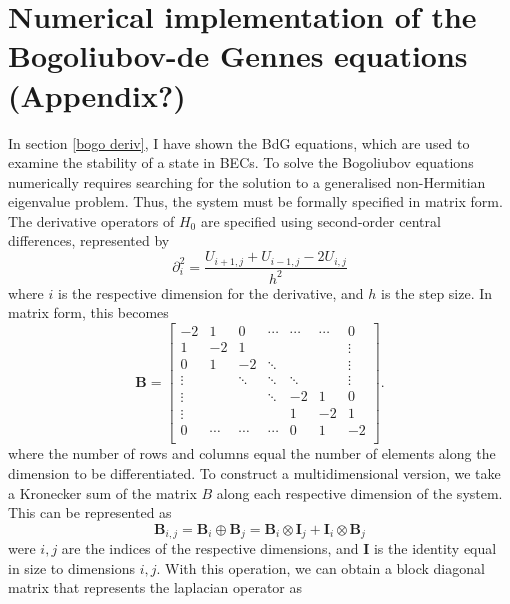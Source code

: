 \section{Numerical implementation of the Bogoliubov-de Gennes equations (Appendix?)}
In section \ref{bogo deriv}, I have shown the BdG equations, which are used to examine the stability of a state in BECs. To solve the Bogoliubov equations numerically requires searching for the solution to a generalised non-Hermitian eigenvalue problem. Thus, the system must be formally specified in matrix form. The derivative operators of $H_0$ are specified using second-order central differences, represented by
\begin{equation}
    \partial^2_i = \frac{U_{i+1,j} + U_{i-1,j} - 2U_{i,j}}{h^2}
\end{equation}
where $i$ is the respective dimension for the derivative, and $h$ is the step size. In matrix form, this becomes
\begin{equation}
    \mathbf{B} =
    \begin{bmatrix}
            -2      &   1    &    0   &  \cdots   &  \cdots   &  \cdots   & 0 \\
            1       &   -2   &    1   &           &           &     &  \vdots \\
            0       &    1   &   -2   & \ddots    &           &     &  \vdots \\
            \vdots  &        & \ddots & \ddots    & {\ddots}  &     &  \vdots \\
            \vdots  &        &        & \ddots    &    -2     &  1  &       0 \\
            \vdots  &        &        &           &     1     & -2  &       1 \\
            0       & \cdots & \cdots & \cdots    &     0     &  1  &      -2 \\
        \end{bmatrix}.
\end{equation}
where the number of rows and columns equal the number of elements along the dimension to be differentiated. To construct a multidimensional version, we take a Kronecker sum of the matrix $B$ along each respective dimension of the system. This can be represented as
\begin{equation}
    \mathbf{B}_{i,j} = \mathbf{B}_i \oplus \mathbf{B}_j = \mathbf{B}_i \otimes \mathbf{I}_j + \mathbf{I}_i \otimes \mathbf{B}_j
\end{equation}
were $i,j$ are the indices of the respective dimensions, and $\mathbf{I}$ is the identity equal in size to dimensions $i,j$. With this operation, we can obtain a block diagonal matrix that represents the laplacian operator as

